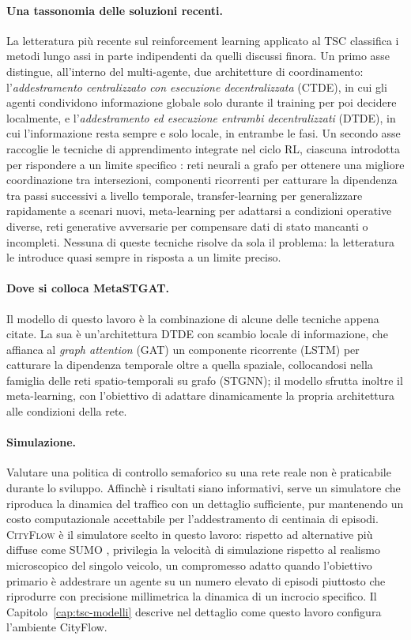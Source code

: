 \paragraph{Una tassonomia delle soluzioni recenti.} La letteratura più
recente sul reinforcement learning applicato al TSC classifica i metodi
lungo assi in parte indipendenti da quelli discussi finora. Un primo asse
distingue, all'interno del multi-agente, due architetture di
coordinamento: l'\emph{addestramento centralizzato con esecuzione
decentralizzata} (CTDE), in cui gli agenti condividono informazione
globale solo durante il training per poi decidere localmente, e
l'\emph{addestramento ed esecuzione entrambi decentralizzati} (DTDE), in
cui l'informazione resta sempre e solo locale, in entrambe le fasi. 
Un secondo asse raccoglie le tecniche di apprendimento
integrate nel ciclo RL, ciascuna introdotta per rispondere a un limite
specifico \citep{xiao2025tscreview}:
reti neurali a grafo per ottenere una migliore coordinazione tra intersezioni, 
componenti ricorrenti per catturare la dipendenza tra passi successivi a livello temporale,
transfer-learning per generalizzare rapidamente a scenari nuovi, 
meta-learning per adattarsi a condizioni operative diverse,
reti generative avversarie per compensare dati di stato mancanti o incompleti.
Nessuna di queste tecniche risolve da sola il problema: la letteratura
le introduce quasi sempre in risposta a un limite preciso.


\paragraph{Dove si colloca MetaSTGAT.} Il modello di questo lavoro è la combinazione 
di alcune delle tecniche appena citate. 
La sua è un'architettura DTDE con scambio locale di informazione, che 
affianca al \emph{graph attention} (GAT) un componente ricorrente (LSTM) per catturare la dipendenza temporale oltre
a quella spaziale, collocandosi nella famiglia delle reti spatio-temporali
su grafo (STGNN); il modello sfrutta inoltre il meta-learning,
con l'obiettivo di adattare dinamicamente la propria architettura alle condizioni della rete. 

\paragraph{Simulazione.} Valutare una politica di controllo semaforico su
una rete reale non è praticabile durante lo sviluppo. Affinchè i risultati siano 
informativi, serve un simulatore che riproduca la dinamica del traffico 
con un dettaglio sufficiente, pur mantenendo un costo
computazionale accettabile per l'addestramento di centinaia di episodi. 
\textsc{CityFlow} \citep{zhang2019cityflow} è il simulatore scelto
in questo lavoro: rispetto ad alternative più diffuse come SUMO
\citep{lopez2018sumo}, privilegia
la velocità di simulazione rispetto al realismo microscopico del singolo
veicolo, un compromesso adatto quando l'obiettivo primario è addestrare un
agente su un numero elevato di episodi piuttosto che riprodurre con
precisione millimetrica la dinamica di un incrocio specifico. Il
Capitolo~\ref{cap:tsc-modelli} descrive nel dettaglio come questo lavoro
configura l'ambiente CityFlow.
